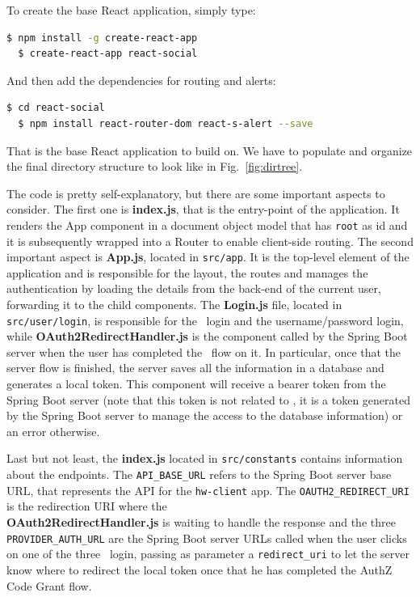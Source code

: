 \noindent To create the base React application, simply type:
\begin{lstlisting}[language=bash]
  $ npm install -g create-react-app
  $ create-react-app react-social
\end{lstlisting}

\noindent And then add the dependencies for routing and alerts:
\begin{lstlisting}[language=bash]
  $ cd react-social
  $ npm install react-router-dom react-s-alert --save
\end{lstlisting}

\noindent That is the base React application to build on. We have to populate and organize the final directory structure to look like in Fig.~\ref{fig:dirtree}.

The code is pretty self-explanatory, but there are some important aspects to consider. The first one is \textbf{index.js}, that is the entry-point of the application. It renders the App component in a document object model that has \texttt{root} as id and it is subsequently wrapped into a Router to enable client-side routing. The second important aspect is \textbf{App.js}, located in \texttt{src/app}. It is the top-level element of the application and is responsible for the layout, the routes and manages the authentication by loading the details from the back-end of the current user, forwarding it to the child components. The \textbf{Login.js} file, located in \texttt{src/user/login}, is responsible for the \oauth\ login and the username/password login, while \textbf{OAuth2RedirectHandler.js} is the component called by the Spring Boot server when the user has completed the \oauth\ flow on it. In particular, once that the server flow is finished, the server saves all the information in a database and generates a local token. This component will receive a bearer token from the Spring Boot server (note that this token is not related to \oauth, it is a token generated by the Spring Boot server to manage the access to the database information) or an error otherwise.

Last but not least, the \textbf{index.js} located in \texttt{src/constants} contains information about the endpoints. The \texttt{API\_BASE\_URL} refers to the Spring Boot server base URL, that represents the API for the \texttt{hw-client} app. The \texttt{OAUTH2\_REDIRECT\_URI} is the redirection URI where the \\ \textbf{OAuth2RedirectHandler.js} is waiting to handle the response and the three \texttt{PROVIDER\_AUTH\_URL} are the Spring Boot server URLs called when the user clicks on one of the three \oauth\ login, passing as parameter a \texttt{redirect\_uri} to let the server know where to redirect the local token once that he has completed the AuthZ Code Grant flow. 

